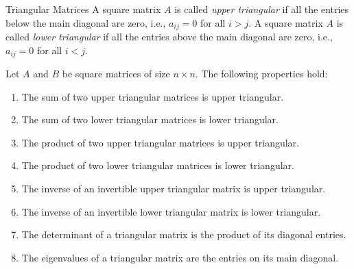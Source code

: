 \documentclass[openany]{book}
\begin{document}
\begin{mydefinition}{Triangular Matrices}
A square matrix $A$ is called \emph{upper triangular} if all the entries below the main diagonal are zero, i.e., $a_{ij} = 0$ for all $i > j$. A square matrix $A$ is called \emph{lower triangular} if all the entries above the main diagonal are zero, i.e., $a_{ij} = 0$ for all $i < j$.
\end{mydefinition}
\begin{mytheorem}
Let $A$ and $B$ be square matrices of size $n \times n$. The following properties hold:
\begin{enumerate}
    \item The sum of two upper triangular matrices is upper triangular.
    \item The sum of two lower triangular matrices is lower triangular.
    \item The product of two upper triangular matrices is upper triangular.
    \item The product of two lower triangular matrices is lower triangular.
    \item The inverse of an invertible upper triangular matrix is upper triangular.
    \item The inverse of an invertible lower triangular matrix is lower triangular.
    \item The determinant of a triangular matrix is the product of its diagonal entries.
    \item The eigenvalues of a triangular matrix are the entries on its main diagonal.
\end{enumerate}
\end{mytheorem}
\end{document}
